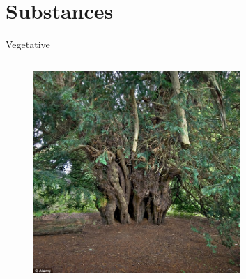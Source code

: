\documentclass[xcolor=dvipsnames]{beamer}
\begin{document}
\section{Substances}


\begin{frame}[fragile]{Vegetative}
  \begin{columns}[T] %
    \begin{column}{0.99\textwidth}
      \begin{figure}[H]
        \centering
        \includegraphics[width=0.7\textwidth]{ankerwyke-tree}
      \end{figure}
    \end{column}%
  \end{columns}
\end{frame}
\end{document}
